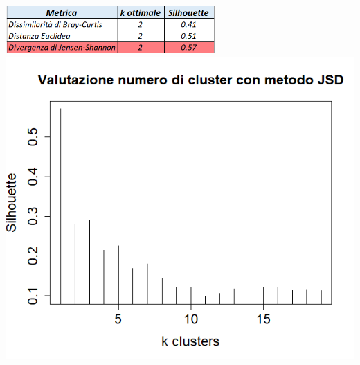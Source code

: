 \begin{Figure}
\begin{multicols}{2}
    \centering
         \vspace*{1.7cm}
     \includegraphics[width=8cm,keepaspectratio, scale=0.3]{images/real_tabella.PNG}
    \includegraphics[width=\linewidth,keepaspectratio]{images/silhouette.png}
     \end{multicols}
  \end{Figure}

